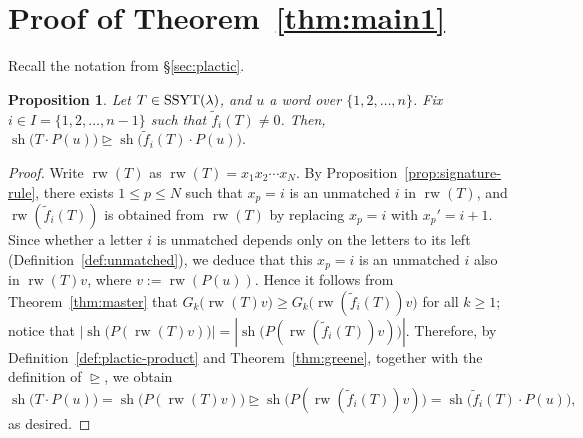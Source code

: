 \documentclass[reqno]{amsart}
\newtheorem{proposition}[theorem]{Proposition}
\theoremstyle{definition}
\theoremstyle{remark}
\numberwithin{equation}{section}
\newcommand{\tf}{\tilde f}
\newcommand{\dom}{\trianglerighteq}
\newcommand{\shape}{\operatorname{sh}}
\newcommand{\rw}{\operatorname{rw}}
\begin{document}
	\section{Proof of Theorem~\ref{thm:main1}}\label{sec:proof-thm1}
	
	Recall the notation from \S \ref{sec:plactic}.
	
	\begin{proposition}\label{prop:Tw-ge-fiTw}
		Let $T\in \operatorname{SSYT}(\lambda)$,
		and $u$ a word over $\{1,2,\dots,n\}$.
		Fix $i\in I=\{1,2,\dots,n-1\}$ such that $\tf_i(T)\ne0$.
		Then,
		$
		\shape\bigl(T\cdot P(u)\bigr)\dom \shape\bigl(\tf_i(T)\cdot P(u)\bigr).
		$
	\end{proposition}
	
	\begin{proof}
		Write $\rw(T)$ as $\rw(T)=x_1x_2\cdots x_N$.
		By Proposition~\ref{prop:signature-rule},
		there exists $1\le p\le N$ such that $x_p=i$ is an unmatched $i$ in $\rw(T)$,
		and $\rw(\tf_i(T))$ is obtained from $\rw(T)$ by replacing $x_p=i$ with $x_p'=i+1$.
		Since whether a letter $i$ is unmatched depends only on the letters to its left
		(Definition~\ref{def:unmatched}),
		we deduce that this $x_p=i$ is an unmatched $i$ also in $\rw(T)v$, where $v:=\rw(P(u))$.
		Hence it follows from Theorem~\ref{thm:master} that $G_k\bigl(\rw(T)v\bigr)\ge G_k\bigl(\rw(\tf_i(T))v\bigr)$ for all $k\ge1$;
		notice that $|\shape\bigl(P(\rw(T)v)\bigr)|=|\shape\bigl(P(\rw(\tf_i(T))v)\bigr)|$.
		Therefore, by Definition~\ref{def:plactic-product} and Theorem~\ref{thm:greene}, together with the definition of $\dom$, we obtain
		$$\shape\bigl(T\cdot P(u)\bigr)=
		\shape\bigl(P(\rw(T)v)\bigr)\dom 
		\shape\bigl(P(\rw(\tf_i(T))v)\bigr)=\shape\bigl(\tf_i(T)\cdot P(u)\bigr),$$
		as desired.
	\end{proof}
	
\end{document}
